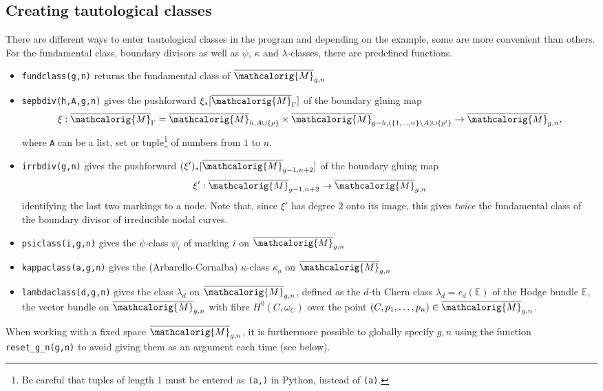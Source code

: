 \documentclass[11pt]{article}
\newcommand{\M}{\ensuremath{\overline{\mathcalorig{M}}}}
\begin{document}
\subsection{Creating tautological classes} \label{Sect:entertaut}
There are different ways to enter tautological classes in the program and depending on the example, some are more convenient than others.
For the fundamental class, boundary divisors as well as $\psi$, $\kappa$ and $\lambda$-classes, there are predefined functions.
\begin{itemize}
 \item \verb|fundclass(g,n)| returns the fundamental class of $\M_{g,n}$
 \item \verb|sepbdiv(h,A,g,n)| gives the pushforward $\xi_* [\M_\Gamma]$ of the boundary gluing map
 \[\xi : \M_\Gamma = \M_{h,A \cup \{p\}} \times \M_{g-h,(\{1, \ldots, n\} \setminus A) \cup \{p'\}} \to \M_{g,n},\]
 where \verb|A| can be a list, set or tuple\footnote{Be careful that tuples of length $1$ must be entered as \texttt{(a,)} in Python, instead of \texttt{(a)}.} of numbers from $1$ to $n$.
 \item \verb|irrbdiv(g,n)| gives the pushforward $(\xi')_* [\M_{g-1,n+2}]$ of the boundary gluing map
 \[\xi' : \M_{g-1,n+2} \to \M_{g,n}\]
 identifying the last two markings to a node.  Note that, since $\xi'$ has degree $2$ onto its image, this gives \emph{twice} the fundamental class of the boundary divisor of irreducible nodal curves.
 \item \verb|psiclass(i,g,n)| gives the $\psi$-class $\psi_i$ of marking $i$ on $\M_{g,n}$
 \item \verb|kappaclass(a,g,n)| gives the (Arbarello-Cornalba) $\kappa$-class $\kappa_a$ on $\M_{g,n}$
 \item \verb|lambdaclass(d,g,n)| gives the class $\lambda_d$ on $\M_{g,n}$, defined as the $d$-th Chern class $\lambda_d=c_d(\mathbb{E})$ of the Hodge bundle $\mathbb{E}$, the vector bundle on $\M_{g,n}$ with fibre $H^0(C, \omega_C)$ over the point $(C,p_1, \ldots, p_n) \in \M_{g,n}$.
\end{itemize}

When working with a fixed space $\M_{g,n}$, it is furthermore possible to globally specify $g,n$ using the function \verb|reset_g_n(g,n)| to avoid giving them as an argument each time (see below).
\end{document}
